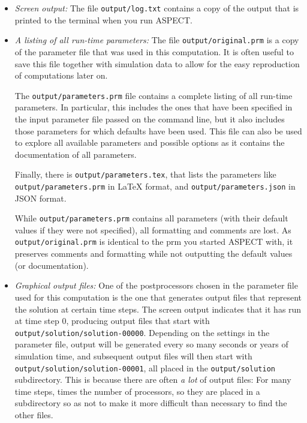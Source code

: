 \documentclass{article}
\newcommand{\aspect}{\textsc{ASPECT}}
\begin{document}
\begin{itemize}

\item \textit{Screen output:} The file \texttt{output/log.txt} contains a copy
  of the output that is printed to the terminal when you run \aspect{}.

\item \textit{A listing of all run-time parameters:} The file
  \texttt{output/original.prm} is a copy of the parameter file that was used
  in this computation. It is often useful to save this file together with
  simulation data to allow for the easy reproduction of computations later on.

  The \texttt{output/parameters.prm} file contains a complete listing of all
  run-time parameters. In particular, this includes the ones that have been
  specified in the input parameter file passed on the command line, but it
  also includes those parameters for which defaults have been used. This file
  can also be used to explore all available parameters and possible options as
  it contains the documentation of all parameters.

  Finally, there is \texttt{output/parameters.tex}, that lists the parameters
  like \texttt{output/parameters.prm} in \LaTeX{} format, and
  \texttt{output/parameters.json} in JSON format.
  
  While \texttt{output/parameters.prm} contains all parameters (with their
  default values if they were not specified), all formatting and comments are
  lost. As \texttt{output/original.prm} is identical to the prm you started
  \aspect{} with, it preserves comments and formatting while not outputting
  the default values (or documentation).

\item \textit{Graphical output files:} One of the postprocessors chosen
  in the parameter file used for this computation is the one that generates
  output files that represent the solution at certain time steps. The screen output
  indicates that it has run at time step 0, producing output files that start
  with \texttt{output/solution/solution-00000}. Depending on the settings in the
  parameter file, output will be generated every so many seconds or years of
  simulation time, and subsequent output files will then start with
  \texttt{output/solution/solution-00001}, all placed in the
  \texttt{output/solution} subdirectory. This is because there are often
  \textit{a lot} of output files: For many time steps, times the number of
  processors, so they are placed in a subdirectory so as not to make it more
  difficult than necessary to find the other files.
  

\end{itemize}
\end{document}

